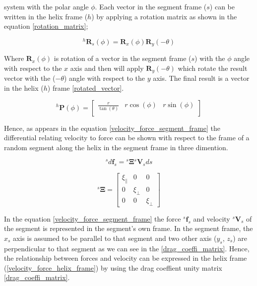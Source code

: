 \documentclass[12pt,a4paper,titlepage]{report}
\begin{document}
system with the polar angle $\phi$. Each vector in the segment frame ($s$) can be written in the helix
frame ($h$) by applying a rotation matrix as shown in the equation \ref{rotation_matrix};
  

\begin{equation}
 ^{h}\bm{R}_s(\phi) = \bm{R}_x(\phi)\bm{R}_y(-\theta)
\label{rotation_matrix}
\end{equation}

Where $\bm{R}_x(\phi)$ is rotation of a vector in the segment frame ($s$) with the $\phi$ angle with
respect to the $x$
axis and then will apply $\bm{R}_y(-\theta)$ which rotate the result vector with the ($-\theta$) angle with
respect to the $y$ axis. The final result is a vector in the helix ($h$) frame \ref{rotated_vector}.



\begin{equation}
 ^{h}\bm{P}(\phi) = \begin{bmatrix}
       \frac{r}{\tan(\theta)} & r\cos(\phi) & r\sin(\phi)    \\[0.3em]
       
     			   \end{bmatrix}
\label{rotated_vector}
\end{equation}

Hence, as appears in the equation \ref{velocity_force_segment_frame} the differential relating velocity to force can be shown with respect to the frame of 
a random segment along the helix in the segment frame in three dimention.   



\begin{equation}
 ^{s}d\bm{f}_s = {^{s}\bm{\Xi}}{^{s}\bm{V}_s}{ds}
\label{velocity_force_segment_frame}
\end{equation}


\begin{equation}
 ^{s}\bm\Xi = \begin{bmatrix}
       \xi_{\parallel}  & 0 		 & 0           \\[0.3em]
       0		 & \xi_{\perp}           & 0\\[0.3em]
       0           	& 0 		& \xi_{\perp}
     \end{bmatrix}
\label{drag_coeffi_matrix}
\end{equation}

In the equation \ref{velocity_force_segment_frame} the force $^{s}\bm{f}_s$ and velocity $^{s}\bm{V}_s$ of
the segment is represented in the segment\rq{}s own frame. 
In the segment frame, the $x_s$ axis is assumed to be parallel to that segment and two other axis 
($y_s$, $z_s$) are perpendicular to that segment as we can see in the \ref{drag_coeffi_matrix}.
Hence, the relationship between forces and velocity can be expressed in the helix 
frame (\ref{velocity_force_helix_frame}) by using the drag coeffient unity matrix \ref{drag_coeffi_matrix}.
\end{document}
